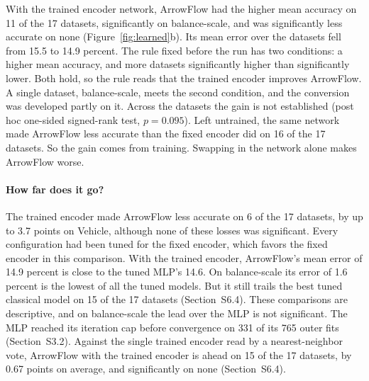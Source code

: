 With the trained encoder network, ArrowFlow had the higher mean accuracy on 11 of the 17 datasets, significantly on balance-scale, and was significantly less accurate on none (Figure~\ref{fig:learned}b). Its mean error over the datasets fell from 15.5 to 14.9 percent. The rule fixed before the run has two conditions: a higher mean accuracy, and more datasets significantly higher than significantly lower. Both hold, so the rule reads that the trained encoder improves ArrowFlow. A single dataset, balance-scale, meets the second condition, and the conversion was developed partly on it. Across the datasets the gain is not established (post hoc one-sided signed-rank test, $p=0.095$). Left untrained, the same network made ArrowFlow less accurate than the fixed encoder did on 16 of the 17 datasets. So the gain comes from training. Swapping in the network alone makes ArrowFlow worse.

\paragraph{How far does it go?} The trained encoder made ArrowFlow less accurate on 6 of the 17 datasets, by up to 3.7 points on Vehicle, although none of these losses was significant. Every configuration had been tuned for the fixed encoder, which favors the fixed encoder in this comparison. With the trained encoder, ArrowFlow's mean error of 14.9 percent is close to the tuned MLP's 14.6. On balance-scale its error of 1.6 percent is the lowest of all the tuned models. But it still trails the best tuned classical model on 15 of the 17 datasets (Section~S6.4). These comparisons are descriptive, and on balance-scale the lead over the MLP is not significant. The MLP reached its iteration cap before convergence on 331 of its 765 outer fits (Section~S3.2). Against the single trained encoder read by a nearest-neighbor vote, ArrowFlow with the trained encoder is ahead on 15 of the 17 datasets, by 0.67 points on average, and significantly on none (Section~S6.4).
